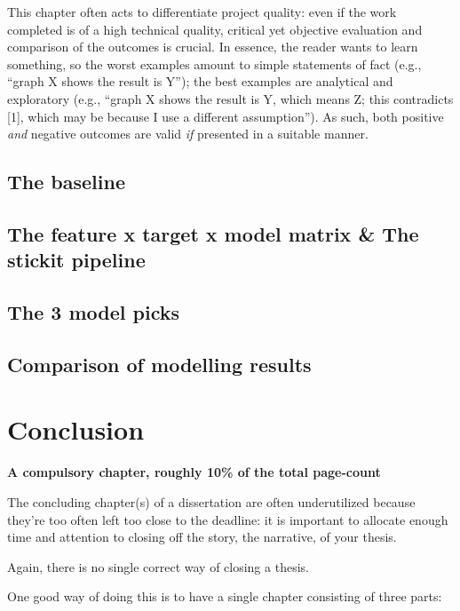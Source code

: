 \documentclass[ %
                    author={Daniel Page},
                supervisor={Dr. Andrew Calway},
                    degree={MSc},
                     title={Some Structural Guidelines for Data Science MSc Theses, Including Those With Long Titles that Run Across Multiple Lines on the Front Page},
                  subtitle={And those including an optional subtitle too, for good measure},
                      type={},
                      year={2021}]{dissertation}
\begin{document}
\noindent
This chapter often acts to differentiate project quality: even if the work
completed is of a high technical quality, critical yet objective evaluation 
and comparison of the outcomes is crucial.  In essence, the reader wants to
learn something, so the worst examples amount to simple statements of fact 
(e.g., ``graph X shows the result is Y''); the best examples are analytical 
and exploratory (e.g., ``graph X shows the result is Y, which means Z; this 
contradicts [1], which may be because I use a different assumption'').  As 
such, both positive {\em and}\/ negative outcomes are valid {\em if} presented 
in a suitable manner.

\section{The baseline}
\section{The feature x target x model matrix & The stickit pipeline}
\section{The 3 model picks}
\section{Comparison of modelling results}



\chapter{Conclusion}
\label{chap:conclusion}

{\bf A compulsory chapter,  roughly 10\% of the total page-count}
\vspace{1cm} 

\noindent
The concluding chapter(s) of a dissertation are often underutilized because they're 
too often left too close to the deadline: it is important to allocate enough time and 
attention to closing off the story, the narrative, of your thesis.

Again, there is no single correct way of closing a thesis. 

One good way of doing this is to have a single chapter consisting of three parts:
\end{document}

